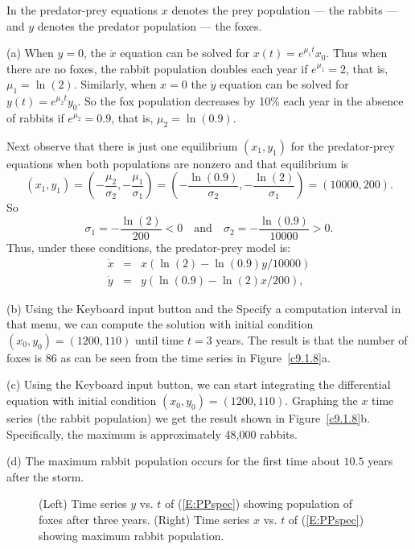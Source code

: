 \documentclass{ximera}
\begin{document}
\soln In the predator-prey equations $x$ denotes the prey population --- 
the rabbits --- and $y$ denotes the predator population --- the foxes.

\noindent (a) When $y=0$, the $\dot{x}$ equation can be solved for 
$x(t)=e^{\mu_1t}x_0$.  Thus when there are no foxes, the rabbit population 
doubles each year if $e^{\mu_1}=2$, that is, $\mu_1=\ln(2)$.  Similarly, when
$x=0$ the $\dot{y}$ equation can be solved for $y(t)=e^{\mu_2 t}y_0$.  So the
fox population decreases by 10\% each year in the absence of rabbits if 
$e^{\mu_2}=0.9$, that is, $\mu_2=\ln(0.9)$.

Next observe that there is just one equilibrium $(x_1,y_1)$ for the 
predator-prey equations when both populations are nonzero and that 
equilibrium is 
\[
(x_1,y_1) = \left(-\frac{\mu_2}{\sigma_2},-\frac{\mu_1}{\sigma_1}\right) = 
\left(-\frac{\ln(0.9)}{\sigma_2},-\frac{\ln(2)}{\sigma_1}\right) = 
(10000,200).
\]
So
\[
\sigma_1 = -\frac{\ln(2)}{200}<0 \quad \mbox{and} \quad
\sigma_2 = -\frac{\ln(0.9)}{10000}>0.
\]
Thus, under these conditions, the predator-prey model is:
\begin{equation}  \label{E:PPspec}
\begin{array}{rcl}
\dot{x} & = & x(\ln(2) - \ln(0.9)y/10000) \\
\dot{y} & = & y(\ln(0.9) - \ln(2)x/200),
\end{array}
\end{equation}

\noindent (b) Using the {\sf Keyboard input} button and the {\sf Specify a
computation interval} in that menu, we can compute the solution with initial
condition $(x_0,y_0)=(1200,110)$ until time $t=3$ years.  The result is that
the number of foxes is $86$ as can be seen from the time series in 
Figure~\ref{c9.1.8}a.

\noindent (c)  Using the {\sf Keyboard input} button, we can start
integrating the differential equation with initial condition
$(x_0,y_0)=(1200,110)$.  Graphing the $x$ time series (the rabbit population)
we get the result shown in Figure~\ref{c9.1.8}b.  Specifically, the 
maximum is approximately 48,000 rabbits. 

\noindent (d)  The maximum rabbit population occurs for the first time about 
$10.5$ years after the storm.

\begin{figure}[htb]
     \centerline{%
     }
     \caption{(Left) Time series $y$ vs. $t$ of (\protect\ref{E:PPspec}) 
	showing population of foxes after three years. (Right) Time series $x$ 
	vs. $t$ of (\protect\ref{E:PPspec}) showing maximum rabbit population.}
\end{figure}
\end{document}
